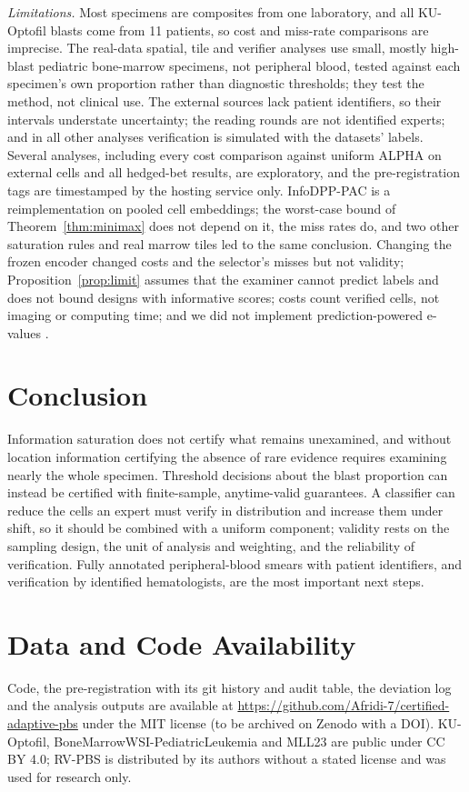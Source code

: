 \documentclass[journal]{IEEEtran}
\begin{document}
\emph{Limitations.} Most specimens are composites from one laboratory, and all KU-Optofil blasts come from 11 patients, so cost and miss-rate comparisons are imprecise. The real-data spatial, tile and verifier analyses use small, mostly high-blast pediatric bone-marrow specimens, not peripheral blood, tested against each specimen's own proportion rather than diagnostic thresholds; they test the method, not clinical use. The external sources lack patient identifiers, so their intervals understate uncertainty; the reading rounds are not identified experts; and in all other analyses verification is simulated with the datasets' labels. Several analyses, including every cost comparison against uniform ALPHA on external cells and all hedged-bet results, are exploratory, and the pre-registration tags are timestamped by the hosting service only. InfoDPP-PAC is a reimplementation on pooled cell embeddings; the worst-case bound of Theorem~\ref{thm:minimax} does not depend on it, the miss rates do, and two other saturation rules and real marrow tiles led to the same conclusion. Changing the frozen encoder changed costs and the selector's misses but not validity; Proposition~\ref{prop:limit} assumes that the examiner cannot predict labels and does not bound designs with informative scores; costs count verified cells, not imaging or computing time; and we did not implement prediction-powered e-values \cite{csillag2025ppe}.

\section{Conclusion}
Information saturation does not certify what remains unexamined, and without location information certifying the absence of rare evidence requires examining nearly the whole specimen. Threshold decisions about the blast proportion can instead be certified with finite-sample, anytime-valid guarantees. A classifier can reduce the cells an expert must verify in distribution and increase them under shift, so it should be combined with a uniform component; validity rests on the sampling design, the unit of analysis and weighting, and the reliability of verification. Fully annotated peripheral-blood smears with patient identifiers, and verification by identified hematologists, are the most important next steps.

\section*{Data and Code Availability}
Code, the pre-registration with its git history and audit table, the deviation log and the analysis outputs are available at \url{https://github.com/Afridi-7/certified-adaptive-pbs} under the MIT license (to be archived on Zenodo with a DOI). KU-Optofil, BoneMarrowWSI-PediatricLeukemia and MLL23 are public under CC BY 4.0; RV-PBS is distributed by its authors without a stated license and was used for research only.
\end{document}
